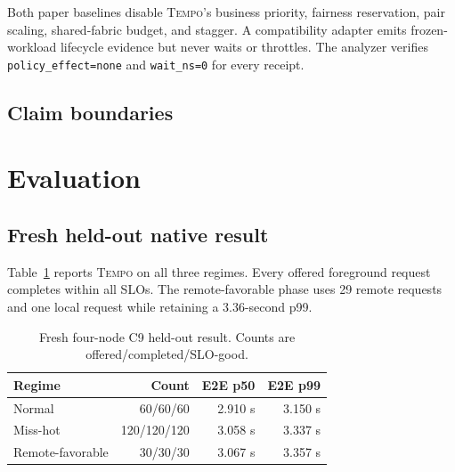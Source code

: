 \documentclass[10pt,twocolumn]{article}
\newcommand{\system}{\textsc{Tempo}\xspace}
\begin{document}
Both paper baselines disable \system's business priority, fairness reservation,
pair scaling, shared-fabric budget, and stagger.  A compatibility adapter emits
frozen-workload lifecycle evidence but never waits or throttles.  The analyzer
verifies \texttt{policy\_effect=none} and \texttt{wait\_ns=0} for every receipt.

\subsection{Claim boundaries}

\begin{center}
\end{center}

\section{Evaluation}

\subsection{Fresh held-out native result}

Table~\ref{tab:headline} reports \system on all three regimes.  Every offered
foreground request completes within all SLOs.  The remote-favorable phase uses
29 remote requests and one local request while retaining a 3.36-second p99.

\begin{table}[t]
\centering
\caption{Fresh four-node C9 held-out result.  Counts are
offered/completed/SLO-good.}
\label{tab:headline}
\small
\begin{tabular}{lrrr}
\toprule
Regime & Count & E2E p50 & E2E p99 \\
\midrule
Normal & 60/60/60 & 2.910 s & 3.150 s \\
Miss-hot & 120/120/120 & 3.058 s & 3.337 s \\
Remote-favorable & 30/30/30 & 3.067 s & 3.357 s \\
\bottomrule
\end{tabular}
\end{table}
\end{document}
